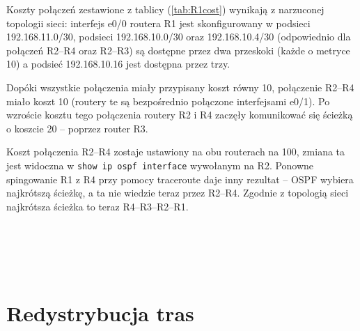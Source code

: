 \documentclass[a4paper,12pt,notitlepage]{article}
\begin{document}
Koszty połączeń zestawione z tablicy (\ref{tab:R1cost}) wynikają z narzuconej topologii sieci: interfejs e0/0 routera R1 jest skonfigurowany w podsieci 192.168.11.0/30, podsieci 192.168.10.0/30 oraz 192.168.10.4/30 (odpowiednio dla połączeń R2--R4 oraz R2--R3) są dostępne przez dwa przeskoki (każde o metryce 10) a podsieć 192.168.10.16 jest dostępna przez trzy.

Dopóki wszystkie połączenia miały przypisany koszt równy 10, połączenie R2--R4 miało koszt 10 (routery te są bezpośrednio połączone interfejsami e0/1). Po wzroście kosztu tego połączenia routery R2 i R4 zaczęły komunikować się ścieżką o koszcie 20 -- poprzez router R3.

Koszt połączenia R2--R4 zostaje ustawiony na obu routerach na 100, zmiana ta jest widoczna w \texttt{show ip ospf interface} wywołanym na R2. Ponowne spingowanie R1 z R4 przy pomocy traceroute daje inny rezultat -- OSPF wybiera najkrótszą ścieżkę, a ta nie wiedzie teraz przez R2--R4. Zgodnie z topologią sieci najkrótsza ścieżka to teraz R4--R3--R2--R1.

\inputminted[label=Router R4 - \#ping 192.168.11.1, firstline=377, lastline=379]{text}{R4.txt}
\inputminted[label=Router R4 - \#traceroute 192.168.11.1, firstline=394, lastline=397]{text}{R4.txt}

\inputminted[label=Router R2 - koszty łączy, firstline=247, lastline=251]{text}{R2.txt}

\inputminted[label=Router R2 - koszty łączy po zmianie, firstline=325, lastline=372]{text}{R2.txt}

\inputminted[label=Router R4 - \#ping 192.168.11.1, firstline=535, lastline=537]{text}{R4.txt}
\inputminted[label=Router R4 - \#traceroute 192.168.11.1, firstline=541, lastline=545]{text}{R4.txt}

\section{Redystrybucja tras}

\inputminted[label=Router R1 - \#show ip route, firstline=838, lastline=844]{text}{R1.txt}
\inputminted[label=Router R5 - \#show ip route, firstline=718, lastline=728]{text}{R5.txt}

\inputminted[label=Router R5 - stan końcowy, firstline=729, lastline=817]{text}{R5.txt}
\end{document}
